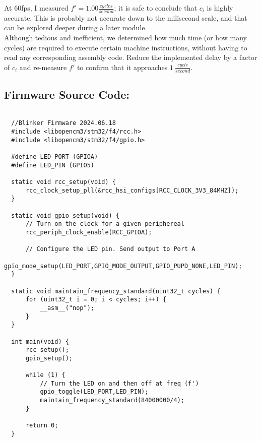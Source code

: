\documentclass[a4paper,12pt]{article}   	%
\begin{document}
\begin{flushleft}
At 60fps, I measured $f' = 1.00 \frac{cycles}{second}$; it is safe to conclude that $c_i$ is highly accurate. 
This is probably not accurate down to the milisecond scale, and that can be explored
deeper during a later module.\\[2 ex]

Although tedious and inefficient, we determined how much time (or how many cycles) are required 
to execute certain machine instructions, without having to read any corresponding assembly code.
Reduce the implemented delay by a factor of $c_i$ and re-measure $f'$ to confirm that it approaches $1\ \frac{cycle}{second}$.\\[2 ex]



\end{flushleft}

\subsection*{Firmware Source Code:}
\begin{lstlisting}

  //Blinker Firmware 2024.06.18
  #include <libopencm3/stm32/f4/rcc.h>
  #include <libopencm3/stm32/f4/gpio.h>
  
  #define LED_PORT (GPIOA)
  #define LED_PIN (GPIO5)
  
  static void rcc_setup(void) {
      rcc_clock_setup_pll(&rcc_hsi_configs[RCC_CLOCK_3V3_84MHZ]);
  }
  
  static void gpio_setup(void) {
      // Turn on the clock for a given periphereal
      rcc_periph_clock_enable(RCC_GPIOA);
  
      // Configure the LED pin. Send output to Port A
      gpio_mode_setup(LED_PORT,GPIO_MODE_OUTPUT,GPIO_PUPD_NONE,LED_PIN);
  }
  
  static void maintain_frequency_standard(uint32_t cycles) {
      for (uint32_t i = 0; i < cycles; i++) {
          __asm__("nop");
      }
  }
  
  int main(void) {
      rcc_setup();
      gpio_setup();
  
      while (1) {
          // Turn the LED on and then off at freq (f')
          gpio_toggle(LED_PORT,LED_PIN);
          maintain_frequency_standard(84000000/4);
      }
  
      return 0;
  }


\end{lstlisting}
\end{document}
